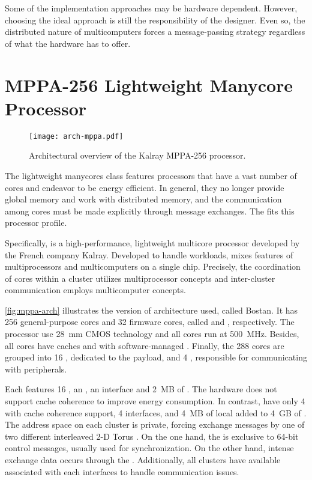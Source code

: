 			Some of the implementation approaches may be hardware dependent.
			However, choosing the ideal approach is still the responsibility of the \os designer.
			Even so, the distributed nature of multicomputers forces a message-passing
			strategy regardless of what the hardware has to offer.

\section{MPPA-256 Lightweight Manycore Processor}
\label{sec.mppa}

	\begin{figure}[!tb]
		\centering%
		\caption{Architectural overview of the Kalray MPPA-256 processor.}%
		\label{fig:mppa-arch}%
		\texttt{[image: arch-mppa.pdf]}%
	\end{figure}
	
	The lightweight manycores class features processors that have a vast
	number of cores and endeavor to be energy efficient. In general,
	they no longer provide global memory and work with distributed memory, and
	the communication among cores must be made explicitly through message
	exchanges. The \mppa fits this processor profile.

	Specifically, \mppa is a high-performance, lightweight multicore processor
	developed by the French company Kalray. Developed to handle \mimd workloads,
	\mppa mixes features of multiprocessors and multicomputers on a single chip.
	Precisely, the coordination of cores within a cluster utilizes multiprocessor
	concepts and inter-cluster communication employs multicomputer concepts.

	\autoref{fig:mppa-arch} illustrates the version of \mppa architecture used, called Bostan.
	It has 256 general-purpose cores and 32 firmware cores, called \pes and \rms, respectively.
	The processor use 28~mm CMOS technology and all cores run at 500~MHz.
	Besides, all cores have caches and \mmus with software-managed \tlbs.
	Finally, the 288 cores are grouped into 16 \cclusters, dedicated to
	the payload, and 4 \ioclusters, responsible for communicating with peripherals.

	Each \ccluster features 16 \pes, an \rm, an \noc interface and 2~MB of \sram.
	The hardware does not support cache coherence to improve energy consumption.
	In contrast, \ioclusters have only 4 \rms with cache coherence support,
	4 \noc interfaces, and 4~MB of local \sram added to 4~GB of \dram.
	The address space on each cluster is private, forcing exchange messages
	by one of two different interleaved 2-D Torus \nocs.
	On the one hand, the \cnoc is exclusive to 64-bit control messages,
	usually used for synchronization.
	On the other hand, intense exchange data occurs through the \dnoc.
	Additionally, all clusters have available \dmas associated with each
	\noc interfaces to handle communication issues.

